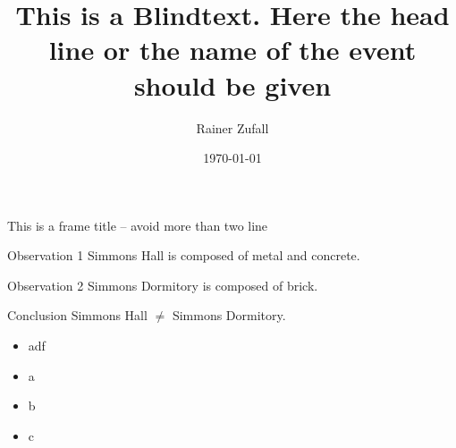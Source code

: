 \documentclass[aspectratio=169]{beamer}
\title[Shortened title]{This is a Blindtext. Here the head line or the name of the event should be given}
\author{Rainer Zufall}
\date{\today}
\institute[I. ITP -- AG ESoCM]{I. Institute of Theoretical Physics}
\begin{document}
{
\begin{frame}
	\titlepage
\end{frame}
}
\addtocounter{framenumber}{-1}

\begin{frame}{This is a frame title -- avoid more than two line}
	\begin{block}{Observation 1}
		Simmons Hall is composed of metal and concrete.
	\end{block}
	\begin{exampleblock}{Observation 2}
		Simmons Dormitory is composed of brick.
	\end{exampleblock}
	\begin{alertblock}{Conclusion}
		Simmons Hall $\not=$ Simmons Dormitory.
	\end{alertblock}
    \begin{itemize}[$\triangleright$]
        \item adf
        \item a
        \item b
        \item c
    \end{itemize}
\end{frame}
\end{document}
